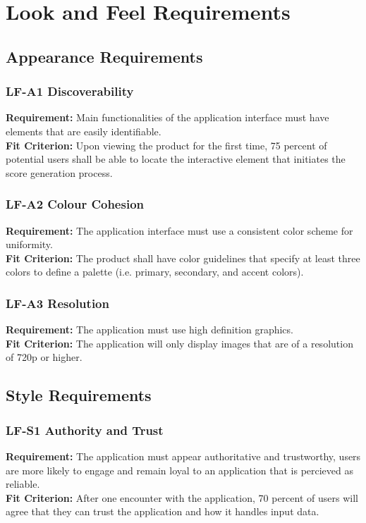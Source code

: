 \documentclass[12pt]{article}
\begin{document}
\section{Look and Feel Requirements}
\subsection{Appearance Requirements}
\subsubsection*{LF-A1 Discoverability}
\textbf{Requirement:} Main functionalities of the application interface must have elements that are easily identifiable.\\
\textbf{Fit Criterion:} Upon viewing the product for the first time, 75 percent of potential 
users shall be able to locate the interactive element that initiates the score generation process.
\subsubsection*{LF-A2 Colour Cohesion}
\textbf{Requirement:} The application interface must use a consistent color scheme for uniformity.\\
\textbf{Fit Criterion:} The product shall have color guidelines that specify at least three colors to define a palette 
(i.e. primary, secondary, and accent colors).
\subsubsection*{LF-A3 Resolution}
\textbf{Requirement:} The application must use high definition graphics.\\
\textbf{Fit Criterion:} The application will only display images that are of a resolution of 720p or higher.
\subsection{Style Requirements}
\subsubsection*{LF-S1 Authority and Trust}
\textbf{Requirement:} The application must appear authoritative and trustworthy, users are more likely to engage
and remain loyal to an application that is percieved as reliable.\\
\textbf{Fit Criterion:} After one encounter with the application, 70 percent of users will agree 
that they can trust the application and how it handles input data.
\end{document}
